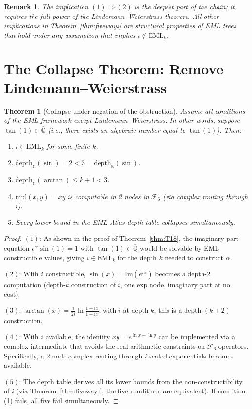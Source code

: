 \documentclass[11pt]{article}
\newtheorem{theorem}{Theorem}[section]
\newtheorem{remark}{Remark}[section]
\begin{document}
\begin{remark}
The implication $(1) \Rightarrow (2)$ is the deepest part of the chain; it requires
the full power of the Lindemann--Weierstrass theorem.  All other implications in
Theorem~\ref{thm:fiveways} are structural properties of EML trees that hold under
any assumption that implies $i \notin \mathrm{EML}_k$.
\end{remark}

\section{The Collapse Theorem: Remove Lindemann--Weierstrass}

\begin{theorem}[Collapse under negation of the obstruction]
\label{thm:collapse}
Assume all conditions of the EML framework except Lindemann--Weierstrass.
In other words, suppose $\tan(1) \in \overline{\mathbb{Q}}$ (i.e.,
there exists an algebraic number equal to $\tan(1)$).
Then:
\begin{enumerate}
\item $i \in \mathrm{EML}_k$ for some finite $k$.
\item $\mathrm{depth}_\mathbb{C}(\sin) = 2 < 3 = \mathrm{depth}_\mathbb{R}(\sin)$.
\item $\mathrm{depth}_\mathbb{C}(\arctan) \leq k + 1 < 3$.
\item $\mathrm{mul}(x,y) = xy$ is computable in 2 nodes in $\mathcal{F}_6$
      (via complex routing through $i$).
\item Every lower bound in the EML Atlas depth table collapses simultaneously.
\end{enumerate}
\end{theorem}

\begin{proof}
$(1)$: As shown in the proof of Theorem~\ref{thm:T18}, the imaginary part equation
$e^\alpha \sin(1) = 1$ with $\tan(1) \in \overline{\mathbb{Q}}$ would be solvable
by EML-constructible values, giving $i \in \mathrm{EML}_k$ for the depth $k$
needed to construct $\alpha$.

$(2)$: With $i$ constructible, $\sin(x) = \mathrm{Im}(e^{ix})$ becomes a depth-2
computation (depth-$k$ construction of $i$, one exp node, imaginary part at no cost).

$(3)$: $\arctan(x) = \frac{1}{2i}\ln\frac{1+ix}{1-ix}$; with $i$ at depth $k$,
this is a depth-$(k+2)$ construction.

$(4)$: With $i$ available, the identity $xy = e^{\ln x + \ln y}$ can be
implemented via a complex intermediate that avoids the real-arithmetic constraints
on $\mathcal{F}_6$ operators.  Specifically, a 2-node complex routing through
$i$-scaled exponentials becomes available.

$(5)$: The depth table derives all its lower bounds from the non-constructibility
of $i$ (via Theorem~\ref{thm:fiveways}, the five conditions are equivalent).
If condition (1) fails, all five fail simultaneously.
\end{proof}
\end{document}
